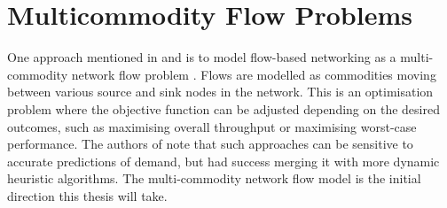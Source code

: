 \section{Multicommodity Flow Problems}
One approach mentioned in \cite{wellons:augmenting} and \cite{dai:dynamic} is to model flow-based networking as a multi-commodity network flow problem \cite[pp. 862--863]{cormen:algorithms}. Flows are modelled as commodities moving between various source and sink nodes in the network. This is an optimisation problem where the objective function can be adjusted depending on the desired outcomes, such as maximising overall throughput or maximising worst-case performance. The authors of \cite{wellons:augmenting} note that such approaches can be sensitive to accurate predictions of demand, but had success merging it with more dynamic heuristic algorithms. The multi-commodity network flow model is the initial direction this thesis will take.
